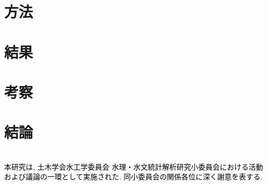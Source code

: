 \documentclass[jscefinal]{jjsce}
\newcommand{\revisioncolor}{black}
\newcommand{\rev}[1]{\textcolor{\revisioncolor}{#1}}
\begin{document}
\section{方法}


\section{結果}


\section{考察}


\section{結論}

\\
\Acknowledgment %
\rev{本研究は, 土木学会水工学委員会 水理・水文統計解析研究小委員会における活動および議論の一環として実施された.
同小委員会の関係各位に深く謝意を表する.}
\end{document}
